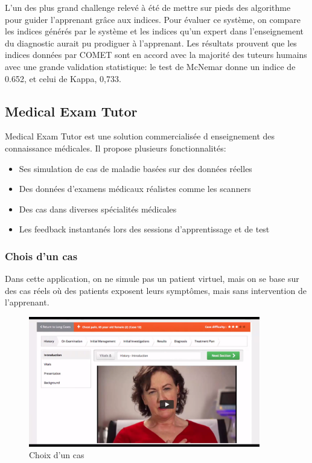 L'un des plus grand challenge relevé à été de mettre sur pieds des algorithme pour guider l'apprenant grâce aux indices. Pour évaluer ce système, on compare les indices générés par le système et les indices qu'un expert dans l'enseignement du diagnostic aurait pu prodiguer à l'apprenant. Les résultats prouvent que les indices données par COMET sont en accord avec la majorité des tuteurs humains avec une grande validation statistique: le test de McNemar donne un indice de 0.652, et celui de Kappa, 0,733.

\subsection{Medical Exam Tutor}

Medical Exam Tutor est une solution commercialisée d enseignement des connaissance médicales. Il propose plusieurs fonctionnalités:

\begin{itemize}
    \item Ses simulation de cas de maladie basées sur des données réelles
    \item Des données d'examens médicaux réalistes comme les scanners
    \item Des cas dans diverses spécialités médicales
    \item Les feedback instantanés lors des sessions d'apprentissage et de test
\end{itemize}

\subsubsection{Chois d'un cas}
Dans cette application, on ne simule pas un patient virtuel, mais on se base sur des cas réels où des patients exposent leurs symptômes, mais sans intervention de l'apprenant.
\begin{figure}
    \centering
    \includegraphics[width=0.9\textwidth]{figures/met/case choice.png}
    \captionsetup{justification=centering}
    \caption{Choix d'un cas}
\end{figure}

